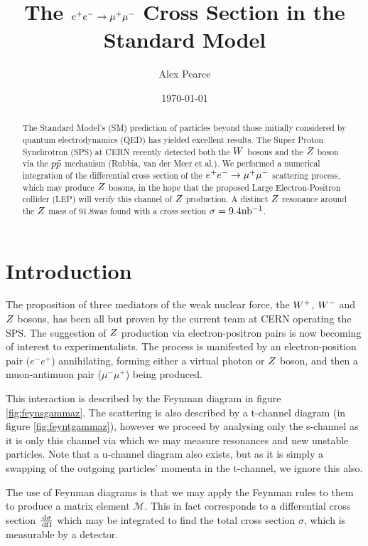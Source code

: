 \documentclass[]{article}
\begin{document}
\title{The $\ee \rarrow \mumu$ Cross Section in the Standard Model}
\author{Alex Pearce}
\date{\today}
\maketitle


\begin{abstract}
The Standard Model's (SM) prediction of particles beyond those initially considered by quantum electrodynamics (QED) has yielded excellent results. The Super Proton Synchrotron (SPS) at CERN recently detected both the $W $ bosons and the $Z $ boson via the $p\bar{p}$ mechanism (Rubbia, van der Meer et al.). We performed a numerical integration of the differential cross section of the $\ee \rarrow \mumu$ scattering process, which may produce $Z $ bosons, in the hope that the proposed Large Electron-Positron collider (LEP) will verify this channel of $Z $ production. A distinct $Z $ resonance around the $Z $ mass of 91.8\GeV was found with a cross section $\sigma=9.4\mbox{nb$^{-1}$} $.
\end{abstract}




\section{Introduction}\label{sec:intro}

The proposition of three mediators of the weak nuclear force, the $W^+ $, $W^- $ and $Z $ bosons, has been all but proven by the current team at CERN operating the SPS. The suggestion of $Z $ production via electron-positron pairs is now becoming of interest to experimentalists. The process is manifested by an electron-position pair ($e^{-}e^{+}$) annihilating, forming either a virtual photon or $Z $ boson, and then a muon-antimuon pair ($\mu^{-}\mu^{+}$) being produced.

This interaction is described by the Feynman diagram in figure \ref{fig:feynsgammaz}. The scattering is also described by a t-channel diagram (in figure \ref{fig:feyntgammaz}), however we proceed by analysing only the s-channel as it is only this channel via which we may measure resonances and new unstable particles. Note that a u-channel diagram also exists, but as it is simply a swapping of the outgoing particles' momenta in the t-channel, we ignore this also.

The use of Feynman diagrams is that we may apply the Feynman rules to them to produce a  matrix element $\mathcal{M}$. This in fact corresponds to a differential cross section $\frac{\,\operatorname{d}\!{\sigma}}{\,\operatorname{d}\!{\Omega}}$ which may be integrated to find the total cross section $\sigma$, which is measurable by a detector.
\end{document}

